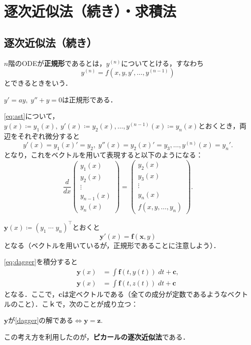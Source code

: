 \section{逐次近似法（続き）・求積法} %
\subsection{逐次近似法（続き）}
\begin{definition}[正規形]
    $n$階のODEが\textbf{正規形}であるとは，$y^{(n)}$についてとける，すなわち
    \begin{equation}
        y^{(n)} = f(x, y, y', \ldots, y^{(n-1)}) \label{eq:ast}
    \end{equation}
    とできるときをいう．
\end{definition}

\begin{example}
    $y'=ay, \; y''+y=0$は正規形である．
\end{example}

\eqref{eq:ast}について，$y(x) \coloneqq y_1(x), \; y'(x) \coloneqq y_2(x), \ldots, y^{(n-1)}(x) \coloneqq y_n(x)$とおくとき，両辺をそれぞれ微分すると
\[ y'(x) = {y_1(x)}' = y_2, \; y''(x) = {y_2(x)}' = y_3, \ldots, y^{(n)}(x) = y_n'.\]
となり，これをベクトルを用いて表現すると以下のようになる：
\begin{equation}
    \frac{d}{dx}
    \begin{pmatrix}
        y_1(x) \\ y_2(x) \\ \vdots \\ y_{n-1}(x) \\ y_n(x)
    \end{pmatrix}
    =
    \begin{pmatrix}
        y_2(x) \\ y_3(x) \\ \vdots \\ y_n(x) \\ f(x,y,\ldots,y_n)
    \end{pmatrix}.
\end{equation}

$\bm{y}(x) \coloneqq (y_1 \; \cdots \; y_n)^\top$とおくと
\begin{equation}
    \bm{y}'(x) = \bm{f}(\bm{x},y) \label{eq:dagger}
\end{equation}
となる（ベクトルを用いているが，正規形であることに注意しよう）．

\eqref{eq:dagger}を積分すると
\begin{align*}
    \bm{y}(x) &= \int \bm{f}(t,y(t)) \; dt + \bm{c}, \\
    \bm{y}(x) &= \int \bm{f}(t,z(t)) \; dt + \bm{c}
\end{align*}
となる．ここで，$\bm{c}$は定ベクトルである（全ての成分が定数であるようなベクトルのこと）．こｋで，次のことが成り立つ：
\begin{center}
    $\bm{y}$が\eqref{dagger}の解である$\iff$$\bm{y}=\bm{z}$.
\end{center}
この考え方を利用したのが，\textbf{ピカールの逐次近似法}である．

